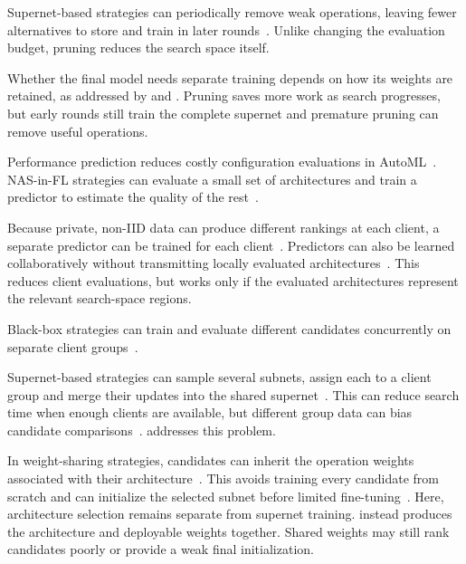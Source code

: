  Supernet-based strategies can periodically remove weak operations, leaving fewer alternatives to store and train in later rounds~\cite{dfnas_2020,peaches_2024}. Unlike changing the evaluation budget, pruning reduces the search space itself.

Whether the final model needs separate training depends on how its weights are retained, as addressed by  and . Pruning saves more work as search progresses, but early rounds still train the complete supernet and premature pruning can remove useful operations.

 Performance prediction reduces costly configuration evaluations in AutoML~\cite{automl_book_hpo_2019}. NAS-in-FL strategies can evaluate a small set of architectures and train a predictor to estimate the quality of the rest~\cite{hapfnas_2025,energy_fednas_2025}.

Because private, non-IID data can produce different rankings at each client, a separate predictor can be trained for each client~\cite{hapfnas_2025}. Predictors can also be learned collaboratively without transmitting locally evaluated architectures~\cite{federated_bayesian_optimization_nas_2023}. This reduces client evaluations, but works only if the evaluated architectures represent the relevant search-space regions.

 Black-box strategies can train and evaluate different candidates concurrently on separate client groups~\cite{decnas_2022,rt_fed_evo_nas_2020,energy_fednas_2025}.

Supernet-based strategies can sample several subnets, assign each to a client group and merge their updates into the shared supernet~\cite{finch_2024}. This can reduce search time when enough clients are available, but different group data can bias candidate comparisons~\cite{decnas_2022}.  addresses this problem.

 In weight-sharing strategies, candidates can inherit the operation weights associated with their architecture~\cite{fl-agnns_2023,optimize_fednas_edge_2021}. This avoids training every candidate from scratch and can initialize the selected subnet before limited fine-tuning~\cite{medical_image_segmentation_fednas_2024}. Here, architecture selection remains separate from supernet training.  instead produces the architecture and deployable weights together. Shared weights may still rank candidates poorly or provide a weak final initialization.

